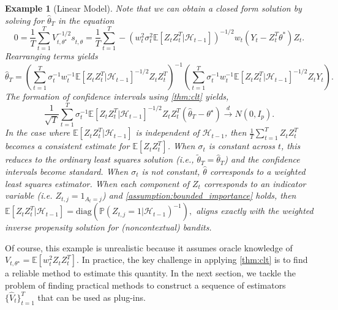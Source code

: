 \documentclass[11pt]{article}
\newcommand{\diag}{\text{diag}}
\newcommand{\E}{\mathbb{E}}
\newtheorem{example}{Example}
\begin{document}
\begin{example}[Linear Model]
Note that we can obtain a closed form solution by solving for $\hat{\theta}_{T}$ in the equation $$0=\frac{1}{T}\sum_{t=1}^{T} V_{t,\theta^{\star}}^{-1/2} s_{t,\hat{\theta}} =\frac{1}{T}\sum_{t=1}^{T}-\left(w_{t}^{2}\sigma_{t}^{2} \E \left[Z_{t}Z_{t}^{T} |\mathcal{H}_{t-1} \right]\right)^{-1/2}w_{t}(Y_{t} - Z_{t}^{T}\theta^{*} )Z_{t}.$$ Rearranging terms yields
$$\hat{\theta}_{T}= \left(\sum_{t=1}^{T} \sigma_{t}^{-1}w_t^{-1}\E \left[Z_{t}Z_{t}^{T} |\mathcal{H}_{t-1} \right]^{-1/2} Z_{t}Z_{t}^{T}\right)^{-1} \left(\sum_{t=1}^{T}\sigma_{t}^{-1}w_t^{-1}\E \left[Z_{t}Z_{t}^{T} |\mathcal{H}_{t-1} \right]^{-1/2} Z_{t}Y_{t}\right).$$
The formation of confidence intervals using \cref{thm:clt} yields, 
$$\frac{1}{\sqrt{T}}\sum_{t=1}^{T}  \sigma_{t}^{-1} \E \left[Z_{t}Z_{t}^{T} |\mathcal{H}_{t-1} \right]^{-1/2} Z_{t}Z_{t}^{T} \left(  \hat{\theta}_{T}- \theta^{\star}\right) \overset{d}{\to} N(0,I_{p}).$$
In the case where $\E \left[Z_{t}Z_{t}^{T} |\mathcal{H}_{t-1} \right]$ is independent of $\mathcal{H}_{t-1}$, then $\frac{1}{T}\sum_{t=1}^{T} Z_{t}Z_{t}^{T}$ becomes a consistent estimate for $\E \left[Z_{t}Z_{t}^{T}\right]$. When $\sigma_{t}$ is constant across $t$, this reduces to the ordinary least squares solution (i.e., $\tilde{\theta}_{T} = \hat{\theta}_{T}$) and the confidence intervals become standard. When $\sigma_{t}$ is not constant, $\hat{\theta}$ corresponds to a weighted least squares estimator. When each component of $Z_{t}$ corresponds to an indicator variable (i.e. $Z_{t,j} = 1_{A_t =j}$) and \cref{assumption:bounded_importance} holds, then $\E \left[Z_{t}Z_{t}^{T} |\mathcal{H}_{t-1} \right] = \diag\left(\mathbb{P}\left(Z_{t,j} = 1 | \mathcal{H}_{t-1} \right)^{-1}\right),$ aligns exactly with the weighted inverse propensity solution for (noncontextual) bandits. 
\end{example}
\fi 

Of course, this example is unrealistic because it assumes oracle knowledge of $V_{t,\theta^{\star}} = \E[w_{t}^{2}Z_{t}Z_{t}^{T}]$. In practice, the key challenge in applying \cref{thm:clt} is to find a reliable method to estimate this quantity. In the next section, we tackle the problem of finding practical methods to construct a sequence of estimators $\{\hat{V}_{t}\}_{t=1}^{T}$ that  can be used as plug-ins.  

\end{document}
